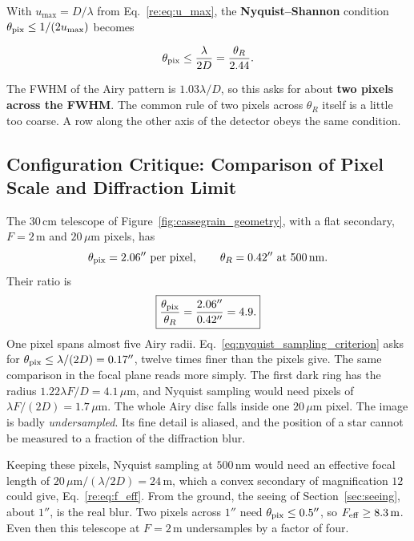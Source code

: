 With $u_{\max}=D/\lambda$ from Eq.~\eqref{re:eq:u_max}, the \textbf{Nyquist--Shannon} condition $\theta_{\rm pix}\le1/(2u_{\max})$ becomes
\begin{keyresult}
	\begin{equation}
		\theta_{\rm pix} \le \frac{\lambda}{2D} = \frac{\theta_R}{2.44}.
		\label{eq:nyquist_sampling_criterion}
	\end{equation}
\end{keyresult}
The FWHM of the Airy pattern is $1.03\lambda/D$, so this asks for about \textbf{two pixels across the FWHM}. The common rule of two pixels across $\theta_R$ itself is a little too coarse. A row along the other axis of the detector obeys the same condition.

\subsection{Configuration Critique: Comparison of Pixel Scale and Diffraction Limit}

The $30\,\mathrm{cm}$ telescope of Figure~\ref{fig:cassegrain_geometry}, with a flat secondary, $F=2\,\mathrm m$ and $20\,\mu\mathrm m$ pixels, has
\[
\theta_{\rm pix}=2.06''\ \text{per pixel},\qquad \theta_R=0.42''\ \text{at}\ 500\,\mathrm{nm}.
\]
Their ratio is
\begin{equation}
	\boxed{\frac{\theta_{\rm pix}}{\theta_R} = \frac{2.06''}{0.42''} = 4.9 .}
	\label{eq:pixel_diffraction_ratio}
\end{equation}
One pixel spans almost five Airy radii. Eq.~\eqref{eq:nyquist_sampling_criterion} asks for $\theta_{\rm pix}\le\lambda/(2D)=0.17''$, twelve times finer than the pixels give. The same comparison in the focal plane reads more simply. The first dark ring has the radius $1.22\lambda F/D=4.1\,\mu\mathrm m$, and Nyquist sampling would need pixels of $\lambda F/(2D)=1.7\,\mu\mathrm m$. The whole Airy disc falls inside one $20\,\mu\mathrm m$ pixel. The image is badly \emph{undersampled}. Its fine detail is aliased, and the position of a star cannot be measured to a fraction of the diffraction blur.

Keeping these pixels, Nyquist sampling at $500\,\mathrm{nm}$ would need an effective focal length of $20\,\mu\mathrm m/(\lambda/2D)=24\,\mathrm m$, which a convex secondary of magnification $12$ could give, Eq.~\eqref{re:eq:f_eff}. From the ground, the seeing of Section~\ref{sec:seeing}, about $1''$, is the real blur. Two pixels across $1''$ need $\theta_{\rm pix}\le0.5''$, so $F_{\rm eff}\ge8.3\,\mathrm m$. Even then this telescope at $F=2\,\mathrm m$ undersamples by a factor of four.


